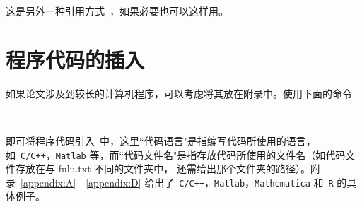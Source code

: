 		这是另外一种引用方式~\cite{das}，如果必要也可以这样用。
		
		
		\section{程序代码的插入}\label{sec:codeinludsion}如果论文涉及到较长的计算机程序，可以考虑将其放在附录中。使用下面的命令
		\begin{verbatim}
			
		\end{verbatim}
		即可将程序代码引入~\CTeX 中，这里``代码语言"是指编写代码所使用的语言，如~{\tt C/C++}，{\tt Matlab} 等，而``代码文件名"是指存放代码所使用的文件名（如代码文件存放在与 fulu.txt 不同的文件夹中，
		还需给出那个文件夹的路径）。附录~\ref{appendix:A}---\ref{appendix:D}
		给出了~{\tt C/C++}，{\tt Matlab}，{\tt Mathematica} 和~{\tt R} 的具体例子。
		
